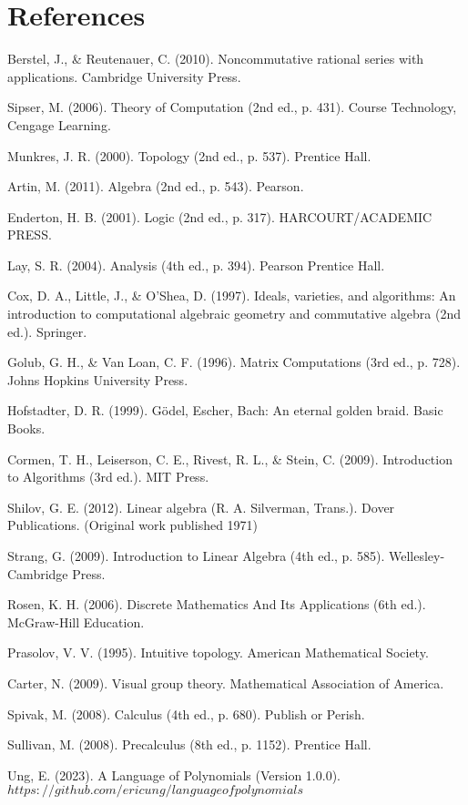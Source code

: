 
\chapter{References} %

Berstel, J., \& Reutenauer, C. (2010). Noncommutative rational series with applications. Cambridge University Press.

Sipser, M. (2006). Theory of Computation (2nd ed., p. 431). Course Technology, Cengage Learning.

Munkres, J. R. (2000). Topology (2nd ed., p. 537). Prentice Hall.

Artin, M. (2011). Algebra (2nd ed., p. 543). Pearson.

Enderton, H. B. (2001). Logic (2nd ed., p. 317). HARCOURT/ACADEMIC PRESS.

Lay, S. R. (2004). Analysis (4th ed., p. 394). Pearson Prentice Hall.

Cox, D. A., Little, J., \& O’Shea, D. (1997). Ideals, varieties, and algorithms: An introduction to computational algebraic geometry and commutative algebra (2nd ed.). Springer.

Golub, G. H., \& Van Loan, C. F. (1996). Matrix Computations (3rd ed., p. 728). Johns Hopkins University Press.

Hofstadter, D. R. (1999). Gödel, Escher, Bach: An eternal golden braid. Basic Books.

Cormen, T. H., Leiserson, C. E., Rivest, R. L., \& Stein, C. (2009). Introduction to Algorithms (3rd ed.). MIT Press.

Shilov, G. E. (2012). Linear algebra (R. A. Silverman, Trans.). Dover Publications. (Original work published 1971)

Strang, G. (2009). Introduction to Linear Algebra (4th ed., p. 585). Wellesley-Cambridge Press.

Rosen, K. H. (2006). Discrete Mathematics And Its Applications (6th ed.). McGraw-Hill Education.

Prasolov, V. V. (1995). Intuitive topology. American Mathematical Society.

Carter, N. (2009). Visual group theory. Mathematical Association of America.

Spivak, M. (2008). Calculus (4th ed., p. 680). Publish or Perish.

Sullivan, M. (2008). Precalculus (8th ed., p. 1152). Prentice Hall.

Ung, E. (2023). A Language of Polynomials (Version 1.0.0). 
$https://github.com/ericung/languageofpolynomials$

